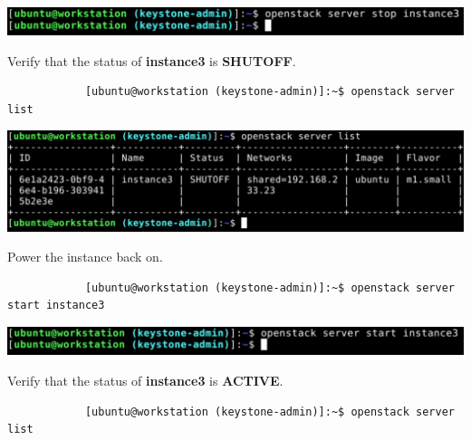 \documentclass[letterpaper, 12pt]{article}
\begin{document}
\begin{enumerate}
\begin{labstep}
        \begin{center}
            \includegraphics[width=\linewidth]{images/part4/step17.png}
        \end{center}
    \end{labstep}

    \begin{labstep}
        Verify that the status of \textbf{instance3} is \textbf{SHUTOFF}.
        \begin{lstlisting}
            [ubuntu@workstation (keystone-admin)]:~$ openstack server list
        \end{lstlisting}

        \begin{center}
            \includegraphics[width=\linewidth]{images/part4/step18.png}
        \end{center}
    \end{labstep}

    \begin{labstep}
        Power the instance back on.
        \begin{lstlisting}
            [ubuntu@workstation (keystone-admin)]:~$ openstack server start instance3
        \end{lstlisting}

        \begin{center}
            \includegraphics[width=\linewidth]{images/part4/step19.png}
        \end{center}
    \end{labstep}

    \begin{labstep}
        Verify that the status of \textbf{instance3} is \textbf{ACTIVE}.
        \begin{lstlisting}
            [ubuntu@workstation (keystone-admin)]:~$ openstack server list
        \end{lstlisting}


\end{labstep}
\end{enumerate}
\end{document}
